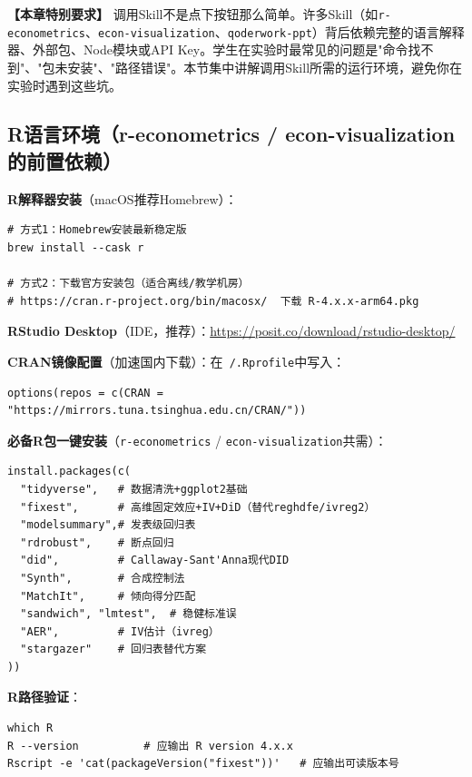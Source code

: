 \textbf{【本章特别要求】} 调用Skill不是点下按钮那么简单。许多Skill（如\texttt{r-econometrics}、\texttt{econ-visualization}、\texttt{qoderwork-ppt}）背后依赖完整的语言解释器、外部包、Node模块或API Key。学生在实验时最常见的问题是"命令找不到"、"包未安装"、"路径错误"。本节集中讲解调用Skill所需的运行环境，避免你在实验时遇到这些坑。

\subsection{R语言环境（r-econometrics / econ-visualization的前置依赖）}

\textbf{R解释器安装}（macOS推荐Homebrew）：

\begin{lstlisting}[style=shell]
# 方式1：Homebrew安装最新稳定版
brew install --cask r

# 方式2：下载官方安装包（适合离线/教学机房）
# https://cran.r-project.org/bin/macosx/  下载 R-4.x.x-arm64.pkg
\end{lstlisting}

\textbf{RStudio Desktop}（IDE，推荐）：\url{https://posit.co/download/rstudio-desktop/}

\textbf{CRAN镜像配置}（加速国内下载）：在\texttt{~/.Rprofile}中写入：

\begin{lstlisting}[style=r]
options(repos = c(CRAN = "https://mirrors.tuna.tsinghua.edu.cn/CRAN/"))
\end{lstlisting}

\textbf{必备R包一键安装}（\texttt{r-econometrics} / \texttt{econ-visualization}共需）：

\begin{lstlisting}[style=r]
install.packages(c(
  "tidyverse",   # 数据清洗+ggplot2基础
  "fixest",      # 高维固定效应+IV+DiD（替代reghdfe/ivreg2）
  "modelsummary",# 发表级回归表
  "rdrobust",    # 断点回归
  "did",         # Callaway-Sant'Anna现代DID
  "Synth",       # 合成控制法
  "MatchIt",     # 倾向得分匹配
  "sandwich", "lmtest",  # 稳健标准误
  "AER",         # IV估计（ivreg）
  "stargazer"    # 回归表替代方案
))
\end{lstlisting}

\textbf{R路径验证}：

\begin{lstlisting}[style=shell]
which R
R --version          # 应输出 R version 4.x.x
Rscript -e 'cat(packageVersion("fixest"))'   # 应输出可读版本号
\end{lstlisting}

